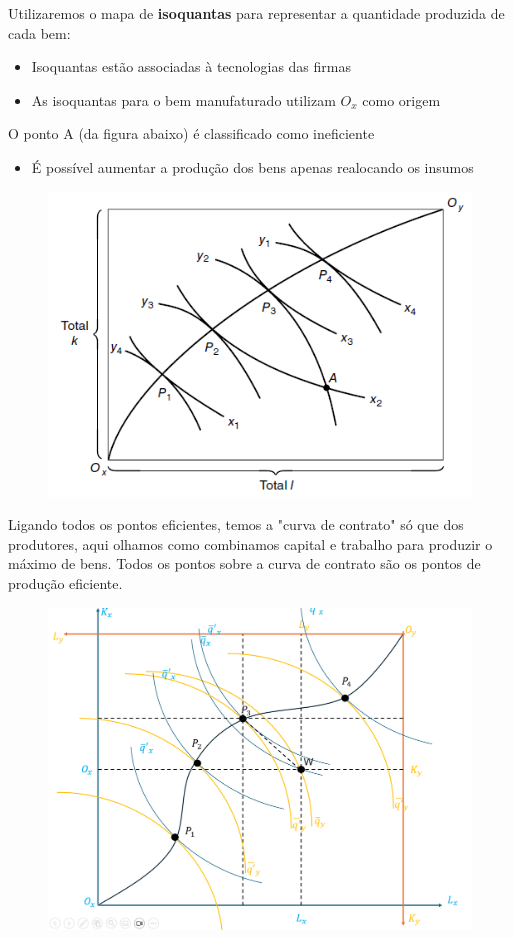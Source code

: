 \documentclass[a4paper,12pt]{article}[abntex2]
\begin{document}
Utilizaremos o mapa de \textbf{isoquantas} para representar a quantidade produzida de cada bem: \begin{itemize}
    \item Isoquantas estão associadas à tecnologias das firmas
    \item As isoquantas para o bem manufaturado utilizam \(O_x\) como origem
\end{itemize} 

O ponto A (da figura abaixo) é classificado como ineficiente\begin{itemize}
    \item É possível aumentar a produção dos bens apenas realocando os insumos 
\end{itemize}

\begin{figure}[H]
    \centering
    \includegraphics[width=0.70\linewidth]{Imagens/a3i2.png}
\end{figure}


Ligando todos os pontos eficientes, temos a "curva de contrato" só que dos produtores, aqui olhamos como combinamos capital e trabalho para produzir o máximo de bens. Todos os pontos sobre a curva de contrato são os pontos de produção eficiente.
\begin{figure}[H]
    \centering
    \includegraphics[width=0.7\linewidth]{Imagens/a5i3.png}
\end{figure}
\end{document}

